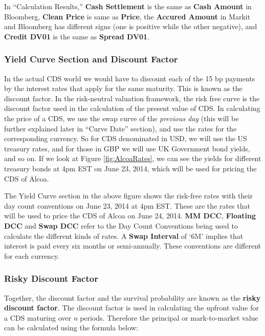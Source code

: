 \documentclass{jss}
\begin{document}
In ``Calculation Results,'' \textbf{Cash Settlement} is the same as \textbf{Cash Amount} in Bloomberg, \textbf{Clean Price} is same as \textbf{Price}, the \textbf{Accured Amount} in Markit and Bloomberg has different signs (one is positive while the other negative), and \textbf{Credit DV01} is the same as \textbf{Spread DV01}.

\subsubsection{Yield Curve Section and Discount Factor}

In the actual CDS world we would have to discount each of the 15 bp payments by the interest rates that apply for the same maturity. This is known as the discount factor. In the risk-neutral valuation framework, the risk free curve is the discount factor used in the calculation of the present value of CDS. In calculating the price of a CDS, we use the swap curve of the \textit{previous day} (this will be further explained later in ``Curve Date'' section), and use the rates for the corresponding currency. So for CDS denominated in USD, we will use the US treasury rates, and for those in GBP we will use UK Government bond yields, and so on. If we look at Figure \ref{fig:AlcoaRates}, we can see the yields for different treasury bonds at 4pm EST on June 23, 2014, which will be used for pricing the CDS of Alcoa.

The Yield Curve section in the above figure shows the risk-free rates with their day count conventions on June 23, 2014 at 4pm EST. These are the rates that will be used to price the CDS of Alcoa on June 24, 2014. \textbf{MM DCC}, \textbf{Floating DCC} and \textbf{Swap DCC} refer to the Day Count Conventions being used to calculate the different kinds of rates. A \textbf{Swap Interval} of `6M' implies that interest is paid every six months or semi-annually. These conventions are different for each currency.


\subsubsection{Risky Discount Factor}

Together, the discount factor and the survival probability are known as the \textbf{risky discount factor}. The discount factor is used in calculating the upfront value for a CDS maturing over \textit{n} periods. Therefore the principal or mark-to-market value can be calculated using the formula below:
\end{document}
